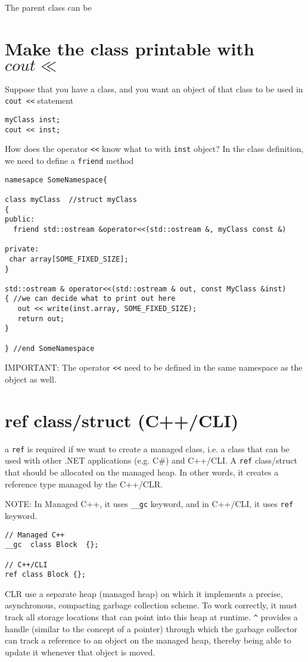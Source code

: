 The parent class can be 


\section{Make the class printable with $cout \ll$}


Suppose that you have a class, and you want an object of that class to be used
in \verb!cout <<! statement
\begin{verbatim}
myClass inst;
cout << inst;
\end{verbatim}

How does the operator \verb!<<! know what to with \verb!inst! object?
In the class definition, we need to define a \verb!friend! method
\begin{verbatim}
namesapce SomeNamespace{

class myClass  //struct myClass
{
public:
  friend std::ostream &operator<<(std::ostream &, myClass const &)
  
private:
 char array[SOME_FIXED_SIZE];
}

std::ostream & operator<<(std::ostream & out, const MyClass &inst)
{ //we can decide what to print out here
   out << write(inst.array, SOME_FIXED_SIZE);
   return out;
}

} //end SomeNamespace
\end{verbatim} 
IMPORTANT: The operator \verb!<<! need to be defined in the same namespace as
the object as well.


\section{ref class/struct (C++/CLI)}
\label{sec:ref_class}

a \verb!ref! is required if we want to create a managed class, i.e. a class that
can be used with other .NET applications (e.g. C\#) and C++/CLI. A \verb!ref!
class/struct that should be allocated on the managed heap. In other words, it
creates a reference type managed by the C++/CLR. 

NOTE: In Managed C++, it uses \verb!__gc! keyword, and in C++/CLI, it uses
\verb!ref! keyword.
\begin{verbatim}
// Managed C++
__gc  class Block  {};

// C++/CLI
ref class Block {}; 
\end{verbatim}

\begin{framed}
CLR use a separate heap (managed heap) on which it implements a precise,
asynchronous, compacting garbage collection scheme. To work correctly, it must track all storage
locations that can point into this heap at runtime. \verb!^! provides a handle
(similar to the concept of a pointer) through which the garbage collector can
track a reference to an object on the managed heap, thereby being able to update
it whenever that object is moved. 
\end{framed}

